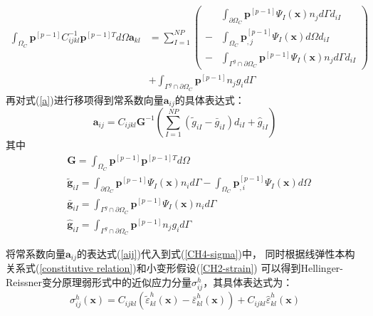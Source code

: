 \begin{equation}\label{a}
\begin{split}
        \int_{\Omega_C}\pmb{p}^{[p-1]}C^{-1}_{ijkl}\pmb{p}^{[p-1]T}d\Omega\pmb{a}_{kl}&=\sum_{I=1}^{N\!P}
        \left (
            \begin{split}
                &\int_{\partial\Omega_C}\pmb{p}^{[p-1]}\Psi_I(\pmb{x})n_jd\Gamma d_{iI} \\
               -&\int_{\Omega_C}\pmb{p}_{,j}^{[p-1]}\Psi_{I}(\pmb{x})d\Omega d_{iI}\\
               -&\int_{\Gamma^g\cap\partial\Omega_C}\pmb{p}^{[p-1]}\Psi_I(\pmb{x})n_jd\Gamma d_{iI}
            \end{split}
         \right ) \\
         &+\int_{\Gamma^g\cap\partial\Omega_C}\pmb{p}^{[p-1]}n_jg_id\Gamma
\end{split}
\end{equation}
再对式(\ref{a})进行移项得到常系数向量$\pmb{a}_{ij}$的具体表达式：
\begin{equation}\label{aij}
 \pmb{a}_{ij}=C_{ijkl}\pmb{G}^{-1}(\sum_{I=1}^{N\!P}(\tilde{g}_{iI}-\bar{g}_{iI})d_{iI}+\hat{g}_{iI})
\end{equation}
其中
\begin{subequations}
\begin{align}
    \label{g1}&\pmb{G}=\int_{\Omega_C}\pmb{p}^{[p-1]}\pmb{p}^{[p-1]T}d\Omega\\
    \label{g2} &\tilde{\pmb g}_{iI}=\int_{\partial\Omega_C}\pmb{p}^{[p-1]}\Psi_I(\pmb{x})n_id\Gamma-\int_{\Omega_C}\pmb{p}_{,i}^{[p-1]}\Psi_{I}(\pmb{x})d\Omega\\
    \label{g3} &\bar{\pmb g}_{iI}=\int_{\Gamma^g\cap\partial\Omega_C}\pmb{p}^{[p-1]}\Psi_I(\pmb{x})n_id\Gamma\\
   \label{g4} &\hat{\pmb g}_{iI}=\int_{\Gamma^g\cap\partial\Omega_C}\pmb{p}^{[p-1]}n_jg_id\Gamma
\end{align}
\end{subequations}\par
将常系数向量$\pmb{a}_{ij}$的表达式(\ref{aij})代入到式(\ref{CH4-sigma})中，
同时根据线弹性本构关系式(\ref{constitutive relation})和小变形假设(\ref{CH2-strain})
可以得到Hellinger-Reissner变分原理弱形式中的近似应力分量$\sigma^h_{ij}$，其具体表达式为：
\begin{equation}\label{sigmah}
    \sigma^h_{ij}(\pmb{x})=C_{ijkl}(\tilde{\varepsilon}^h_{kl}(\pmb{x})-\bar{\varepsilon}^h_{kl}(\pmb{x}))+C_{ijkl}\hat{\varepsilon}^h_{kl}(\pmb{x})
\end{equation}
